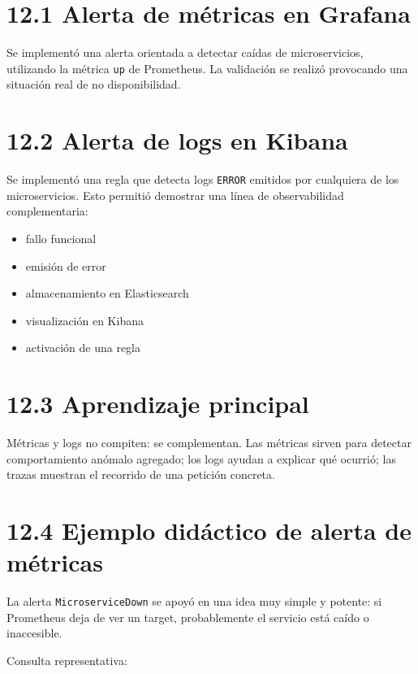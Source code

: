 \documentclass[
a4paper,
12pt]{report}
\providecommand{\tightlist}{%
  \setlength{\itemsep}{0pt}\setlength{\parskip}{0pt}}
\begin{document}
\section{12.1 Alerta de métricas en
Grafana}\label{alerta-de-muxe9tricas-en-grafana}

Se implementó una alerta orientada a detectar caídas de microservicios,
utilizando la métrica \texttt{up} de Prometheus. La validación se
realizó provocando una situación real de no disponibilidad.

\section{12.2 Alerta de logs en Kibana}\label{alerta-de-logs-en-kibana}

Se implementó una regla que detecta logs \texttt{ERROR} emitidos por
cualquiera de los microservicios. Esto permitió demostrar una línea de
observabilidad complementaria:

\begin{itemize}
\tightlist
\item
  fallo funcional
\item
  emisión de error
\item
  almacenamiento en Elasticsearch
\item
  visualización en Kibana
\item
  activación de una regla
\end{itemize}

\section{12.3 Aprendizaje principal}\label{aprendizaje-principal-1}

Métricas y logs no compiten: se complementan. Las métricas sirven para
detectar comportamiento anómalo agregado; los logs ayudan a explicar qué
ocurrió; las trazas muestran el recorrido de una petición concreta.

\section{12.4 Ejemplo didáctico de alerta de
métricas}\label{ejemplo-diduxe1ctico-de-alerta-de-muxe9tricas}

La alerta \texttt{MicroserviceDown} se apoyó en una idea muy simple y
potente: si Prometheus deja de ver un target, probablemente el servicio
está caído o inaccesible.

Consulta representativa:
\end{document}
